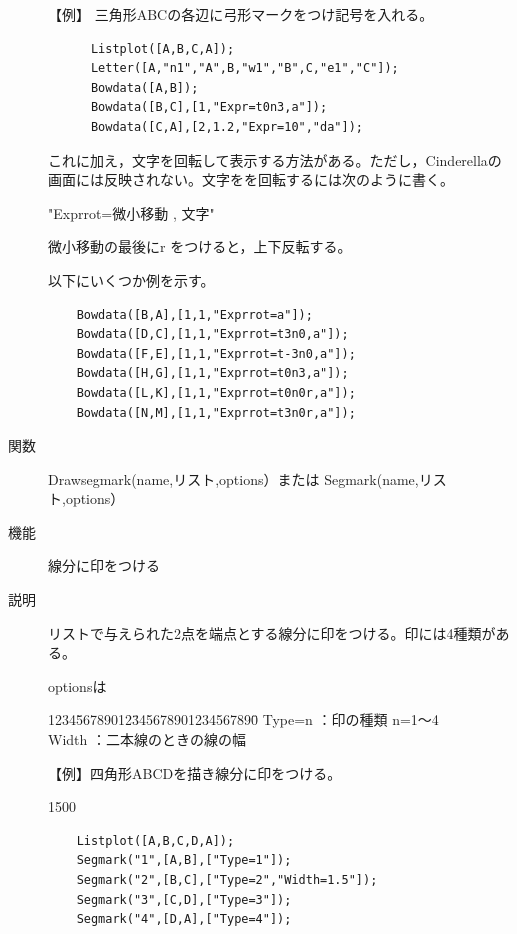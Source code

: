 \documentclass[papersize,a4paper,12pt,uplatex]{jsarticle}
\begin{document}
\begin{description}
【例】  三角形ABCの各辺に弓形マークをつけ記号を入れる。
\begin{verbatim}
      Listplot([A,B,C,A]);
      Letter([A,"n1","A",B,"w1","B",C,"e1","C"]);
      Bowdata([A,B]);
      Bowdata([B,C],[1,"Expr=t0n3,a"]);
      Bowdata([C,A],[2,1.2,"Expr=10","da"]);
\end{verbatim}

\vspace{\baselineskip}
これに加え，文字を回転して表示する方法がある。ただし，Cinderellaの画面には反映されない。文字をを回転するには次のように書く。

\hspace{10mm}"Exprrot=微小移動 , 文字"

 微小移動の最後にr をつけると，上下反転する。
 
以下にいくつか例を示す。
\begin{verbatim}
    Bowdata([B,A],[1,1,"Exprrot=a"]);
    Bowdata([D,C],[1,1,"Exprrot=t3n0,a"]);
    Bowdata([F,E],[1,1,"Exprrot=t-3n0,a"]);
    Bowdata([H,G],[1,1,"Exprrot=t0n3,a"]);
    Bowdata([L,K],[1,1,"Exprrot=t0n0r,a"]);
    Bowdata([N,M],[1,1,"Exprrot=t3n0r,a"]);
\end{verbatim}
\hspace{10mm} 


\hypertarget{drawsegmark}{}
\item[関数]  Drawsegmark(name,リスト,options）または Segmark(name,リスト,options）
\item[機能]  線分に印をつける
\item[説明]  リストで与えられた2点を端点とする線分に印をつける。印には4種類がある。

optionsは
\begin{tabbing}
1234\=56789012\=345678901234567890\=\kill
 \> Type=n \>：印の種類 n=1〜4\\
 \> Width  \>：二本線のときの線の幅
\end{tabbing}

  【例】四角形ABCDを描き線分に印をつける。
  
\begin{layer}{150}{0}
\end{layer}
\hspace{50mm}
\begin{verbatim}
    Listplot([A,B,C,D,A]);
    Segmark("1",[A,B],["Type=1"]); 
    Segmark("2",[B,C],["Type=2","Width=1.5"]);
    Segmark("3",[C,D],["Type=3"]);
    Segmark("4",[D,A],["Type=4"]);
\end{verbatim}


\end{description}
\end{document}
